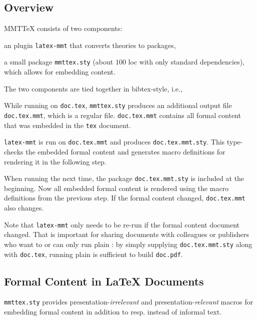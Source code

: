 \subsection{Overview}

MMTTeX consists of two components:
\begin{compactitem}
 \item an \mmt plugin \texttt{latex-mmt} that converts \mmt theories to \latex packages,
 \item a small \latex package \texttt{mmttex.sty} (about $100$ loc with only standard dependencies), which allows for embedding \mmt content.
\end{compactitem}
The two components are tied together in bibtex-style, i.e.,
\begin{compactenum}
 \item While running \latex on \texttt{doc.tex}, \texttt{mmttex.sty} produces an additional output file \texttt{doc.tex.mmt}, which is a regular \mmt file.
 \texttt{doc.tex.mmt} contains all formal content that was embedded in the \texttt{tex} document.
 \item \texttt{latex-mmt} is run on \texttt{doc.tex.mmt} and produces \texttt{doc.tex.mmt.sty}.
  This type-checks the embedded formal content and generates macro definitions for rendering it in the following step.
 \item When running \latex the next time, the package \texttt{doc.tex.mmt.sty} is included at the beginning. Now all embedded formal content is rendered using the macro definitions from the previous step. If the formal content changed, \texttt{doc.tex.mmt} also changes.
\end{compactenum}

\noindent
Note that \texttt{latex-mmt} only needs to be re-run if the formal content document changed.
That is important for sharing documents with colleagues or publishers who want to or can only run plain \latex: by simply supplying \texttt{doc.tex.mmt.sty} along with \texttt{doc.tex}, running plain \latex is sufficient to build \texttt{doc.pdf}.

\subsection{Formal Content in LaTeX Documents}


\texttt{mmttex.sty} provides presentation-\emph{irrelevant} and presentation-\emph{relevant} macros for embedding formal content in addition to resp. instead of informal text.
\medskip

